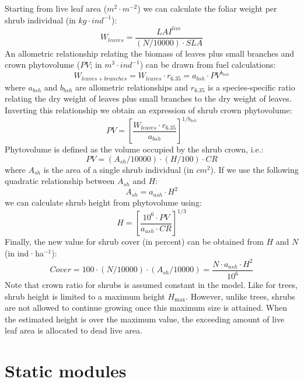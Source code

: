 \documentclass[]{book}
\begin{document}
Starting from live leaf area (\(m^2·m^{-2}\)) we can calculate the foliar weight per shrub individual (in \(kg · ind^{-1}\)):
\begin{equation}
W_{leaves} = \frac{LAI^{live}} {(N/10000) \cdot SLA}
\end{equation}
An allometric relationship relating the biomass of leaves plus small branches and crown phytovolume (\(PV\); in \(m^3·ind^{-1}\)) can be drawn from fuel calculations:
\begin{equation}
W_{leaves+branches} = W_{leaves} \cdot r_{6.35}  = a_{bsh} \cdot PV^{b_{bsh}}
\end{equation}
where \(a_{bsh}\) and \(b_{bsh}\) are allometric relationships and \(r_{6.35}\) is a species-specific ratio relating the dry weight of leaves plus small branches to the dry weight of leaves. Inverting this relationship we obtain an expression of shrub crown phytovolume:
\begin{equation}
PV = \left[\frac{W_{leaves} \cdot r_{6.35}}{a_{bsh}}\right]^{1/b_{bsh}}
\end{equation}
Phytovolume is defined as the volume occupied by the shrub crown, i.e.:
\begin{equation}
PV =  (A_{sh}/10000) \cdot (H/100) \cdot CR
\end{equation}
where \(A_{sh}\) is the area of a single shrub individual (in \(cm^2\)). If we use the following quadratic relationship between \(A_{sh}\) and \(H\):
\begin{equation}
A_{sh} = a_{ash} \cdot H^2
\end{equation}
we can calculate shrub height from phytovolume using:
\begin{equation}
H = \left[\frac{10^6 \cdot PV}{a_{ash} \cdot CR}\right]^{1/3}
\end{equation}
Finally, the new value for shrub cover (in percent) can be obtained from \(H\) and \(N\) (in ind·ha\(^{-1}\)):
\begin{equation}
Cover = 100 \cdot (N/10000) \cdot (A_{sh}/10000) = \frac{N \cdot a_{ash} \cdot H^2}{10^6}
\end{equation}
Note that crown ratio for shrubs is assumed constant in the model. Like for trees, shrub height is limited to a maximum height \(H_{\max}\). However, unlike trees, shrubs are not allowed to continue growing once this maximum size is attained. When the estimated height is over the maximum value, the exceeding amount of live leaf area is allocated to dead live area.

\hypertarget{part-static-modules}{%
\part{Static modules}\label{part-static-modules}}
\end{document}

